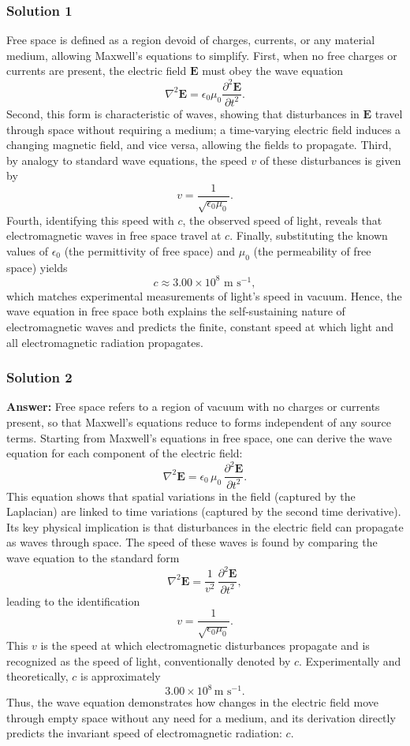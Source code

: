 \documentclass{article}
\begin{document}
\subsubsection{Solution 1}
\noindent
Free space is defined as a region devoid of charges, currents, or any material medium, allowing Maxwell's equations to simplify. First, when no free charges or currents are present, the electric field $\mathbf{E}$ must obey the wave equation
\[
\nabla^2 \mathbf{E} = \epsilon_0 \mu_0 \frac{\partial^2 \mathbf{E}}{\partial t^2}.
\]
Second, this form is characteristic of waves, showing that disturbances in $\mathbf{E}$ travel through space without requiring a medium; a time-varying electric field induces a changing magnetic field, and vice versa, allowing the fields to propagate. Third, by analogy to standard wave equations, the speed $v$ of these disturbances is given by
\[
v = \frac{1}{\sqrt{\epsilon_0 \mu_0}}.
\]
Fourth, identifying this speed with $c$, the observed speed of light, reveals that electromagnetic waves in free space travel at $c$. Finally, substituting the known values of $\epsilon_0$ (the permittivity of free space) and $\mu_0$ (the permeability of free space) yields
\[
c \approx 3.00 \times 10^8 \text{ m s}^{-1},
\]
which matches experimental measurements of light’s speed in vacuum. Hence, the wave equation in free space both explains the self-sustaining nature of electromagnetic waves and predicts the finite, constant speed at which light and all electromagnetic radiation propagates.


\subsubsection{Solution 2}
\textbf{Answer:} Free space refers to a region of vacuum with no charges or currents present, so that Maxwell’s equations reduce to forms independent of any source terms. Starting from Maxwell’s equations in free space, one can derive the wave equation for each component of the electric field:
\[
\nabla^2 \mathbf{E} = \epsilon_{0}\,\mu_{0}\,\frac{\partial^2 \mathbf{E}}{\partial t^2}.
\]
This equation shows that spatial variations in the field (captured by the Laplacian) are linked to time variations (captured by the second time derivative). Its key physical implication is that disturbances in the electric field can propagate as waves through space. The speed of these waves is found by comparing the wave equation to the standard form
\[
\nabla^2 \mathbf{E} = \frac{1}{v^2}\,\frac{\partial^2 \mathbf{E}}{\partial t^2},
\]
leading to the identification
\[
v = \frac{1}{\sqrt{\epsilon_{0} \mu_{0}}}.
\]
This $v$ is the speed at which electromagnetic disturbances propagate and is recognized as the speed of light, conventionally denoted by $c$. Experimentally and theoretically, $c$ is approximately 
\[
3.00 \times 10^8 \,\text{m s}^{-1}.
\]
Thus, the wave equation demonstrates how changes in the electric field move through empty space without any need for a medium, and its derivation directly predicts the invariant speed of electromagnetic radiation: $c$.
\end{document}
